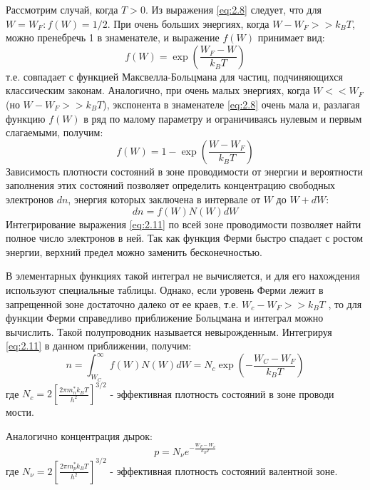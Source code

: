 Рассмотрим случай, когда $T > 0$. Из выражения \eqref{eq:2.8} следует, что для $W=W_F: f(W) =1/2$. При очень больших энергиях, когда 
$ W-W_F>> k_B T $, можно пренебречь 1 в знаменателе, и выражение $f(W)$ принимает вид:
\begin{equation}
	f(W) = \exp(\frac{W_F-W}{k_B T})
	\label{eq:2.9}
\end{equation} 
т.е. совпадает с функцией Максвелла-Больцмана для частиц, подчиняющихся классическим законам. Аналогично, при очень
малых энергиях, когда $W<<W_F$ (но $W-W_F>>k_B T$), экспонента в знаменателе \eqref{eq:2.8} очень мала и, разлагая функцию $f(W)$ в ряд по
малому параметру и ограничиваясь нулевым и первым слагаемыми, получим: 
\begin{equation}
	f(W) = 1 - \exp( \frac{W-W_F}{k_BT})
	\label{eq:2.10}
\end{equation}
Зависимость плотности состояний в зоне проводимости от энергии и вероятности заполнения этих состояний позволяет
определить концентрацию свободных электронов $dn$, энергия которых заключена в интервале от $W$ до $W+dW$:
\begin{equation}
	dn = f(W) N(W)dW
	\label{eq:2.11}
\end{equation}
Интегрирование выражения \eqref{eq:2.11} по всей зоне проводимости позволяет найти полное число электронов в ней. Так как функция
Ферми быстро спадает с ростом энергии, верхний предел можно заменить бесконечностью. 

В элементарных функциях такой интеграл не вычисляется, и для его нахождения используют специальные таблицы. Однако, если
уровень Ферми лежит в запрещенной зоне достаточно далеко от ее краев, т.е. $W_c - W_F>>k_B T$ , то для функции Ферми
справедливо приближение Больцмана и интеграл можно вычислить. Такой полупроводник называется невырожденным. Интегрируя
\eqref{eq:2.11} в данном приближении, получим: 
\begin{equation}
	n=\int_{W_{C}}^{\infty} f(W) N(W) d W=N_{c} \exp(-\frac{W_C-W_F}{k_B T})
	\label{eq:2.12}
\end{equation}
где $N_{c}=2\left[\frac{2 \pi m_{n}^{*} k_{B} T}{h^{2}}\right]^{3 / 2}$ - эффективная плотность состояний в зоне проводи
мости.

Аналогично концентрация дырок: 
\begin{equation}
	p=N_{\nu} e^{-\frac{W_{F}-W_{\nu}}{k_{B} T}}
	\label{eq:2.13}
\end{equation}
где $N_{\nu}=2\left[\frac{2 \pi m_{p}^{*} k_{B} T}{h^{2}}\right]^{3 / 2}$ - эффективная плотность состояний валентной зоне.

